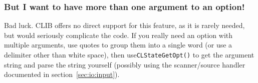 \subsubsection{But I want to have more than one argument to an
  option!}

Bad luck. CLIB offers no direct support for this feature, as it is
rarely needed, but would seriously complicate the code. If you really
need an option with multiple arguments, use quotes to group them into
a single word (or use a delimiter other than white space), then
use\texttt{CLStateGetOpt()} to get the argument string and parse the
string yourself (possibly using the scanner/source handler documented
in section~\ref{sec:io:input}).


